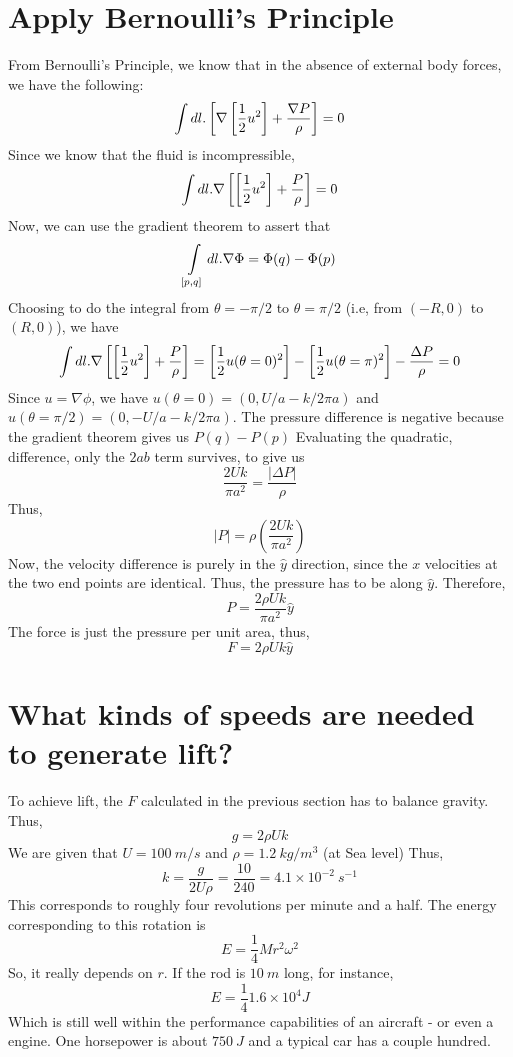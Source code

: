 \documentclass[english]{article}
\begin{document}
\section{Apply Bernoulli's Principle}
From Bernoulli's Principle, we know that in the absence of external body forces,
we have the following:
$$ \intop dl.\left[\nabla\left[\frac{1}{2}u^{2}\right]+\frac{\nabla P}{\rho}\right] =0$$
Since we know that the fluid is incompressible,
$$ \intop dl.\nabla\left[\left[\frac{1}{2}u^{2}\right]+\frac{P}{\rho}\right] = 0$$
Now, we can use the gradient theorem to assert that
$$ \intop_{[p,q]} dl.\nabla\Phi = \Phi(q)-\Phi(p)$$
Choosing to do the integral from $\theta=-\pi/2$ to $\theta=\pi/2$ (i.e, from 
$(-R,0)$ to $(R,0)$), we have
$$  \intop dl.\nabla\left[\left[\frac{1}{2}u^{2}\right]+\frac{P}{\rho}\right] = 
	\left[\frac{1}{2}u(\theta=0)^{2}\right]-\left[\frac{1}{2}u(\theta=\pi)^{2}\right]
	-\frac{\Delta P}{\rho}=0
$$
Since $u=\nabla \phi$, we have $u(\theta=0) = (0,U/a-k/2\pi a)$ and $u(\theta=\pi/2) = (0,-U/a-k/2\pi a)$.
The pressure difference is negative because the gradient theorem gives us $P(q)-P(p)$ 
Evaluating the quadratic, difference, only the $2ab$ term survives, to give us
$$ \frac{2Uk}{\pi a^{2}} = \frac{|\Delta P|}{\rho}$$
Thus,
$$ |P| = \rho\left(\frac{2Uk}{\pi a^{2}}\right) $$
Now, the velocity difference is purely in the $\hat{y}$ direction, since the
$x$ velocities at the two end points are identical.
Thus, the pressure has to be along $\hat{y}$. Therefore,
$$ P = \frac{2\rho Uk}{\pi a^{2}}\hat{y}$$
The force is just the pressure per unit area, thus,
$$ F = 2\rho Uk \hat{y}$$
\section{What kinds of speeds are needed to generate lift?}
To achieve lift, the $F$ calculated in the previous section has to balance
gravity. Thus,
$$ g = 2\rho Uk$$
We are given that $U=100\ m/s$ and $\rho = 1.2\ kg/m^{3}$ (at Sea level)
Thus,
$$ k = \frac{g}{2U\rho} = \frac{10}{240} = 4.1\times 10^{-2}\ s^{-1}$$
This corresponds to roughly four revolutions per minute and a half.
The energy corresponding to this rotation is
$$ E = \frac{1}{4}Mr^{2}\omega^{2}$$
So, it really depends on $r$. If the rod is $10\ m$ long, for instance,
$$ E = \frac{1}{4}1.6\times10^{4} J$$
Which is still well within the performance capabilities of an aircraft
- or even a engine.
One horsepower is about $750\ J$ and a typical car has a couple hundred.
\end{document}
